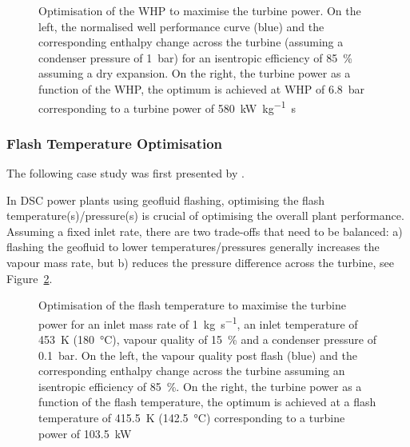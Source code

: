            \begin{figure}[H]
                \centering
                
                \caption[Optimisation of the \ac{WHP} to maximise the turbine power.]{Optimisation of the \ac{WHP} to maximise the turbine power. On the left, the normalised well performance curve (blue) and the corresponding enthalpy change across the turbine (assuming a condenser pressure of \qty{1}{\bar}) for an isentropic efficiency of \qty{85}{\percent} assuming a dry expansion. On the right, the turbine power as a function of the \ac{WHP}, the optimum is achieved at \ac{WHP} of \qty{6.8}{\bar} corresponding to a turbine power of \qty{580}{\kilo\watt\per\kg\s}}
                \label{fig:litrev_whp_opt}
            \end{figure}
    
        \subsubsection{Flash Temperature Optimisation}
            \label{sec:dsc_flash_opt}
            The following case study was first presented by \citeauthor{DiPippo2016} \cite{DiPippo2016}.
            
            In \ac{DSC} power plants using geofluid flashing, optimising the flash temperature(s)/pressure(s) is crucial of optimising the overall plant performance. Assuming a fixed inlet rate, there are two trade-offs that need to be balanced: a) flashing the geofluid to lower temperatures/pressures generally increases the vapour mass rate, but b) reduces the pressure difference across the turbine, see Figure~\ref{fig:litrev_tflash_opt}.

             \begin{figure}[H]
                \centering
                
                \caption[Optimisation of the flash temperature to maximise the turbine power.]{Optimisation of the flash temperature to maximise the turbine power for an inlet mass rate of \qty{1}{\kg\per\s}, an inlet temperature of \qty{453}{\K} (\qty{180}{\degreeCelsius}), vapour quality of \qty{15}{\percent} and a condenser pressure of \qty{0.1}{\bar}. On the left, the vapour quality post flash (blue) and the corresponding enthalpy change across the turbine assuming an isentropic efficiency of \qty{85}{\percent}. On the right, the turbine power as a function of the flash temperature, the optimum is achieved at a flash temperature of \qty{415.5}{\K} (\qty{142.5}{\degreeCelsius}) corresponding to a turbine power of \qty{103.5}{\kilo\watt}}
                \label{fig:litrev_tflash_opt}
            \end{figure}

